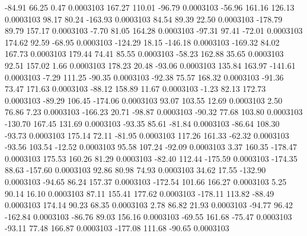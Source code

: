       -84.91       66.25        0.47     0.0003103
      167.27      110.01      -96.79     0.0003103
      -56.96      161.16      126.13     0.0003103
       98.17       80.24     -163.93     0.0003103
       84.54       89.39       22.50     0.0003103
     -178.79       89.79      157.17     0.0003103
       -7.70       81.05      164.28     0.0003103
      -97.31       97.41      -72.01     0.0003103
      174.62       92.59      -68.95     0.0003103
     -124.29       18.15     -146.18     0.0003103
     -169.32       84.02      167.73     0.0003103
      179.44       74.41       85.55     0.0003103
      -58.23      162.88       35.65     0.0003103
       92.51      157.02        1.66     0.0003103
      178.23       20.48      -93.06     0.0003103
      135.84      163.97     -141.61     0.0003103
       -7.29      111.25      -90.35     0.0003103
      -92.38       75.57      168.32     0.0003103
      -91.36       73.47      171.63     0.0003103
      -88.12      158.89       11.67     0.0003103
       -1.23       82.13      172.73     0.0003103
      -89.29      106.45     -174.06     0.0003103
       93.07      103.55       12.69     0.0003103
        2.50       76.86        7.23     0.0003103
     -166.23       20.71      -98.87     0.0003103
      -90.32       77.68      103.80     0.0003103
     -130.70      167.45      131.69     0.0003103
      -93.35       85.61      -81.84     0.0003103
      -86.64      108.30      -93.73     0.0003103
      175.14       72.11      -81.95     0.0003103
      117.26      161.33      -62.32     0.0003103
      -93.56      103.54      -12.52     0.0003103
       95.58      107.24      -92.09     0.0003103
        3.37      160.35     -178.47     0.0003103
      175.53      160.26       81.29     0.0003103
      -82.40      112.44     -175.59     0.0003103
     -174.35       88.63     -157.60     0.0003103
       92.86       80.98       74.93     0.0003103
       34.62       17.55     -132.90     0.0003103
      -94.65       86.24      157.37     0.0003103
     -172.54      101.66      166.27     0.0003103
        5.25       90.14       16.10     0.0003103
       87.11      155.41      177.62     0.0003103
     -178.11      113.82      -88.49     0.0003103
      174.14       90.23       68.35     0.0003103
        2.78       86.82       21.93     0.0003103
      -94.77       96.42     -162.84     0.0003103
      -86.76       89.03      156.16     0.0003103
      -69.55      161.68      -75.47     0.0003103
      -93.11       77.48      166.87     0.0003103
     -177.08      111.68      -90.65     0.0003103

